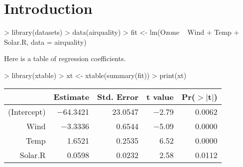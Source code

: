 \documentclass[11pt]{article}
\begin{document}
\section{Introduction}
\begin{Schunk}
\begin{Sinput}
> library(datasets)
> data(airquality)
> fit <- lm(Ozone ~ Wind + Temp + Solar.R, data = airquality)
\end{Sinput}
\end{Schunk}

Here is a table of regression coefficients.\\

\begin{Schunk}
\begin{Sinput}
> library(xtable)
> xt <- xtable(summary(fit))
> print(xt)
\end{Sinput}
% latex table generated in R 2.8.1 by xtable 1.5-2 package
% Sat Mar 14 18:34:11 2009
\begin{table}[ht]
\begin{center}
\begin{tabular}{rrrrr}
  \hline
 & Estimate & Std. Error & t value & Pr($>$$|$t$|$) \\
  \hline
(Intercept) & $-$64.3421 & 23.0547 & $-$2.79 & 0.0062 \\
  Wind & $-$3.3336 & 0.6544 & $-$5.09 & 0.0000 \\
  Temp & 1.6521 & 0.2535 & 6.52 & 0.0000 \\
  Solar.R & 0.0598 & 0.0232 & 2.58 & 0.0112 \\
   \hline
\end{tabular}
\end{center}
\end{table}\end{Schunk}
\end{document}
